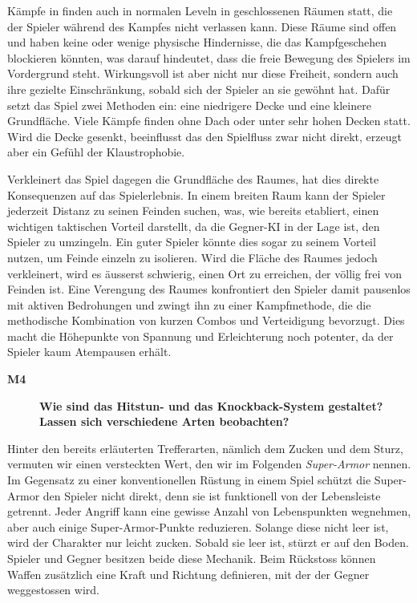 \documentclass[../Main.tex]{subfiles}
\begin{document}
Kämpfe in  finden auch in normalen Leveln in geschlossenen Räumen statt, die der Spieler während des Kampfes nicht verlassen kann. Diese Räume sind offen und haben keine oder wenige physische Hindernisse, die das Kampfgeschehen blockieren könnten, was darauf hindeutet, dass die freie Bewegung des Spielers im Vordergrund steht. Wirkungsvoll ist aber nicht nur diese Freiheit, sondern auch ihre gezielte Einschränkung, sobald sich der Spieler an sie gewöhnt hat. Dafür setzt das Spiel zwei Methoden ein: eine niedrigere Decke und eine kleinere Grundfläche. Viele Kämpfe finden ohne Dach oder unter sehr hohen Decken statt. Wird die Decke gesenkt, beeinflusst das den Spielfluss zwar nicht direkt, erzeugt aber ein Gefühl der Klaustrophobie.

Verkleinert das Spiel dagegen die Grundfläche des Raumes, hat dies direkte Konsequenzen auf das Spielerlebnis. In einem breiten Raum kann der Spieler jederzeit Distanz zu seinen Feinden suchen, was, wie bereits etabliert, einen wichtigen taktischen Vorteil darstellt, da die Gegner-KI in der Lage ist, den Spieler zu umzingeln. Ein guter Spieler könnte dies sogar zu seinem Vorteil nutzen, um Feinde einzeln zu isolieren. Wird die Fläche des Raumes jedoch verkleinert, wird es äusserst schwierig, einen Ort zu erreichen, der völlig frei von Feinden ist. Eine Verengung des Raumes konfrontiert den Spieler damit pausenlos mit aktiven Bedrohungen und zwingt ihn zu einer Kampfmethode, die die methodische Kombination von kurzen Combos und Verteidigung bevorzugt. Dies macht die Höhepunkte von Spannung und Erleichterung noch potenter, da der Spieler kaum Atempausen erhält.

\begin{description}
    \item[\textbf{M4}] \textbf{Wie sind das Hitstun- und das Knockback-System gestaltet? Lassen sich verschiedene Arten beobachten?}
\end{description}

Hinter den bereits erläuterten Trefferarten, nämlich dem Zucken und dem Sturz, vermuten wir einen versteckten Wert, den wir im Folgenden \textit{Super-Armor} nennen. Im Gegensatz zu einer konventionellen Rüstung in einem Spiel schützt die Super-Armor den Spieler nicht direkt, denn sie ist funktionell von der Lebensleiste getrennt. Jeder Angriff kann eine gewisse Anzahl von Lebenspunkten wegnehmen, aber auch einige Super-Armor-Punkte reduzieren. Solange diese nicht leer ist, wird der Charakter nur leicht zucken. Sobald sie leer ist, stürzt er auf den Boden. Spieler und Gegner besitzen beide diese Mechanik. Beim Rückstoss können Waffen zusätzlich eine Kraft und Richtung definieren, mit der der Gegner weggestossen wird.
\end{document}
